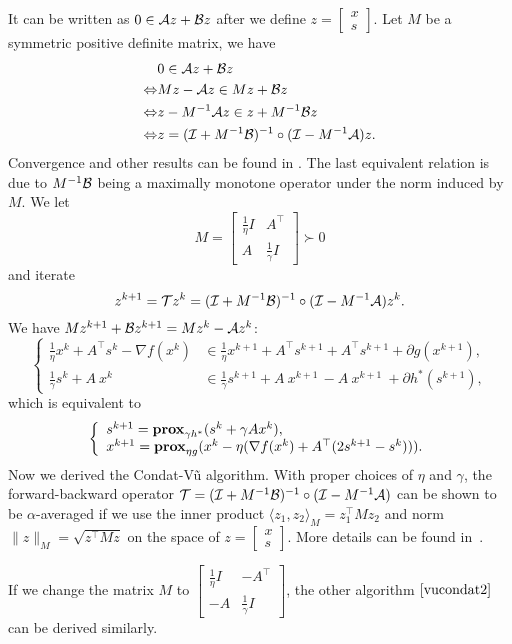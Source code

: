 It can be written as $0\in{\mathcal{A}} z+{\mathcal{B}} z$ after we define $z=\begin{bmatrix}x\\ s\end{bmatrix}$. Let $M$ be a symmetric positive definite matrix, we have
\begin{align*}
&0\in\cA z+\cB z\\
\Leftrightarrow& Mz-\cA z \in Mz+\cB z\\
\Leftrightarrow& z-M^{-1}\cA z \in z+M^{-1}\cB z\\
\Leftrightarrow& z=(\cI+M^{-1}\cB)^{-1}\circ(\cI-M^{-1}\cA)z.
\end{align*}
Convergence and other results can be found in \cite{davis2014convergence}. The last equivalent relation is due to $M^{-1}{\mathcal{B}}$ being a maximally monotone operator under the norm induced by $M$. We let $$M=\begin{bmatrix}
\frac{1}{\eta}I&A^\top\\
A&\frac{1}{\gamma}I
\end{bmatrix}\succ 0$$
and iterate $$z^{k+1}={\mathcal{T}} z^k=({\mathcal{I}}+M^{-1}{\mathcal{B}})^{-1}\circ({\mathcal{I}}-M^{-1}{\mathcal{A}})z^k.$$
We have $Mz^{k+1}+{{\mathcal{B}}}z^{k+1}= Mz^k-{\mathcal{A}} z^k$:
$$\left\{\begin{array}{ll}
\frac{1}{\eta}x^k  +A^\top s^{k}- \nabla f(x^k)&\in \frac{1}{\eta}x^{k+1} + A^\top s^{k+1}+A^\top s^{k+1}+\partial g (x^{k+1}),\\ 
\frac{1}{\gamma}s^k + A~ x^{k~}&\in \frac{1}{\gamma}s^{k+1}+ A~ x^{k+1~} -A ~x^{k+1} ~+\partial h^*(s^{k+1}),
\end{array}\right.$$
which is equivalent to
$$\left\{
\begin{array}{l}
s^{k+1}=\prox_{\gamma h^*} (s^k+\gamma Ax^k),\\
x^{k+1}=\prox_{\eta g}(x^k-\eta(\nabla f(x^k)+A^\top(2s^{k+1}-s^k))).
\end{array}
\right.$$
Now we derived the Condat-V\~{u} algorithm. With proper choices of $\eta$ and $\gamma $, the forward-backward operator ${\mathcal{T}}=({\mathcal{I}}+M^{-1}{\mathcal{B}})^{-1}\circ({\mathcal{I}}-M^{-1}{\mathcal{A}})$ can be shown to be $\alpha$-averaged if we use the inner product $\langle z_1,z_2\rangle_M=z_1^\top Mz_2$ and norm $\|z\|_M=\sqrt{z^\top Mz}$ on the space of $z=\begin{bmatrix}x\\ s\end{bmatrix}$. More details can be found in~\cite{davis2014convergence}.

If we change the matrix $M$ to $\begin{bmatrix}
\frac{1}{\eta}I&-A^\top\\
-A&\frac{1}{\gamma}I
\end{bmatrix}$, the other algorithm $\eqref{vucondat2}$ can be derived similarly.

